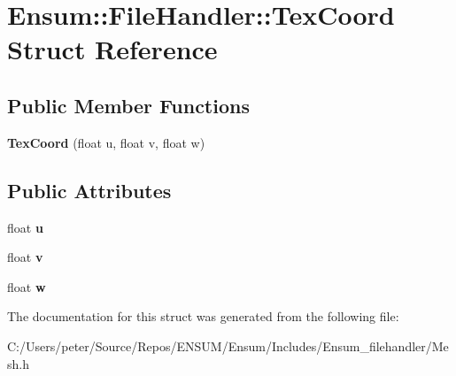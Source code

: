 \hypertarget{struct_ensum_1_1_file_handler_1_1_tex_coord}{}\section{Ensum\+:\+:File\+Handler\+:\+:Tex\+Coord Struct Reference}
\label{struct_ensum_1_1_file_handler_1_1_tex_coord}
\subsection*{Public Member Functions}
\begin{DoxyCompactItemize}
\item 
{\bfseries Tex\+Coord} (float u, float v, float w)\hypertarget{struct_ensum_1_1_file_handler_1_1_tex_coord_ade68c6d8e086d712bc8ec69d243bb3af}{}\label{struct_ensum_1_1_file_handler_1_1_tex_coord_ade68c6d8e086d712bc8ec69d243bb3af}

\end{DoxyCompactItemize}
\subsection*{Public Attributes}
\begin{DoxyCompactItemize}
\item 
float {\bfseries u}\hypertarget{struct_ensum_1_1_file_handler_1_1_tex_coord_a91c1c65798ca8268251f86a419434a37}{}\label{struct_ensum_1_1_file_handler_1_1_tex_coord_a91c1c65798ca8268251f86a419434a37}

\item 
float {\bfseries v}\hypertarget{struct_ensum_1_1_file_handler_1_1_tex_coord_a2a2884161c9b630989c48bfae943dd1e}{}\label{struct_ensum_1_1_file_handler_1_1_tex_coord_a2a2884161c9b630989c48bfae943dd1e}

\item 
float {\bfseries w}\hypertarget{struct_ensum_1_1_file_handler_1_1_tex_coord_aef4ff1dfc5871d77aeb58cb62bbc503b}{}\label{struct_ensum_1_1_file_handler_1_1_tex_coord_aef4ff1dfc5871d77aeb58cb62bbc503b}

\end{DoxyCompactItemize}


The documentation for this struct was generated from the following file\+:\begin{DoxyCompactItemize}
\item 
C\+:/\+Users/peter/\+Source/\+Repos/\+E\+N\+S\+U\+M/\+Ensum/\+Includes/\+Ensum\+\_\+filehandler/Mesh.\+h\end{DoxyCompactItemize}
